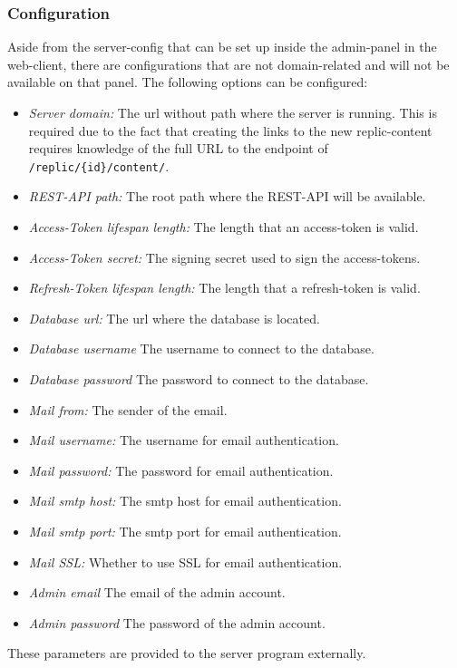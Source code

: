 \subsubsection{Configuration}
Aside from the server-config that can be set up inside the admin-panel in the web-client, there are configurations that are not domain-related and will not be available on that panel.
The following options can be configured:
\begin{itemize}
    \item \textit{Server domain:} The url without path where the server is running.
    This is required due to the fact that creating the links to the new replic-content requires knowledge of the full URL to the endpoint of \texttt{/replic/\{id\}/content/}.
    \item \textit{REST-API path:} The root path where the REST-API will be available.
    \item \textit{Access-Token lifespan length:} The length that an access-token is valid.
    \item \textit{Access-Token secret:} The signing secret used to sign the access-tokens.
    \item \textit{Refresh-Token lifespan length:} The length that a refresh-token is valid.
    \item \textit{Database url:} The url where the database is located.
    \item \textit{Database username} The username to connect to the database.
    \item \textit{Database password} The password to connect to the database.
    \item \textit{Mail from:} The sender of the email.
    \item \textit{Mail username:} The username for email authentication.
    \item \textit{Mail password:} The password for email authentication.
    \item \textit{Mail smtp host:} The smtp host for email authentication.
    \item \textit{Mail smtp port:} The smtp port for email authentication.
    \item \textit{Mail SSL:} Whether to use SSL for email authentication.
    \item \textit{Admin email} The email of the admin account.
    \item \textit{Admin password} The password of the admin account.
\end{itemize}
These parameters are provided to the server program externally.

